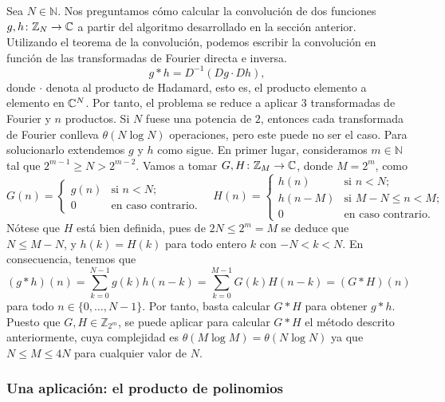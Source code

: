 \documentclass{article}
\begin{document}
Sea $N \in \mathbb{N}$. Nos preguntamos cómo calcular la convolución de dos funciones $g,h \colon \mathbb{Z}_N \to \mathbb{C}$ a partir del algoritmo desarrollado en la sección anterior.  Utilizando el teorema de la convolución, podemos escribir la convolución en función de las transformadas de Fourier directa e inversa.
\[ g \ast h = D^{-1}(Dg \cdot Dh), \]
donde $\cdot$ denota al producto de Hadamard, esto es, el producto elemento a elemento en $\mathbb{C}^N$. Por tanto, el problema se reduce a aplicar $3$ transformadas de Fourier y $n$ productos. Si $N$ fuese una potencia de $2$, entonces cada transformada de Fourier conlleva $\theta(N \log N)$ operaciones, pero este puede no ser el caso. Para solucionarlo extendemos $g$ y $h$ como sigue. En primer lugar, consideramos $m \in \mathbb{N}$ tal que $2^{m-1} \ge N > 2^{m-2}$. Vamos a tomar $G, H \colon \mathbb{Z}_{M} \to \mathbb{C}$, donde $M = 2^m$, como
\[ G(n) = \begin{cases}
    g(n) & \text{si } n < N; \\
    0 & \text{en caso contrario.}
\end{cases} \quad H(n) = \begin{cases}
    h(n) & \text{si } n < N; \\
    h(n-M) & \text{si } M-N \le n < M; \\
    0 & \text{en caso contrario.}
\end{cases}\]
 Nótese que $H$ está bien definida, pues de $2N \le 2^m = M$ se deduce que $N \le M-N$, y $h(k) = H(k)$ para todo entero $k$ con $-N < k < N$. En consecuencia, tenemos que
\[(g \ast h)(n) = \sum_{k = 0}^{N-1} g(k) h(n-k) = \sum_{k = 0}^{M-1} G(k) H(n-k) = (G \ast H)(n)\]
para todo $n \in \{0, \ldots, N-1\}$. Por tanto, basta calcular $G \ast H$ para obtener $g \ast h$. Puesto que $G,H \in \mathbb{Z}_{2^m}$, se puede aplicar para calcular $G \ast H$ el método descrito anteriormente, cuya complejidad es $\theta(M \log M) = \theta(N \log N)$ ya que $N \le M \le 4N$ para cualquier valor de $N$. 

\subsubsection{Una aplicación: el producto de polinomios}
\end{document}
